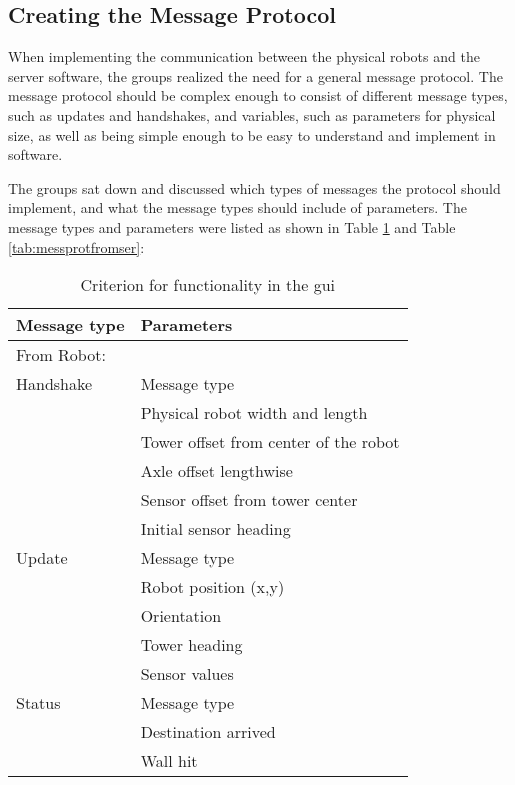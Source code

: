 \subsection{Creating the Message Protocol}
When implementing the communication between the physical robots and the server software, the groups realized the need for a general message protocol. The message protocol should be complex enough to consist of different message types, such as updates and handshakes, and variables, such as parameters for physical size, as well as being simple enough to be easy to understand and implement in software.

The groups sat down and discussed which types of messages the protocol should implement, and what the message types should include of parameters. The message types and parameters were listed as shown in Table \ref{tab:messprotfromrob} and Table \ref{tab:messprotfromser}:

\begin{table}[ht]
\begin{center}
 \begin{tabular}{|l | l|} 
 \hline
 Message type       &	Parameters \\
 \hline
 \hline
 From Robot: & \\
 \hline
 Handshake          &   Message type \\
 					&	Physical robot width and length  \\
                    &   Tower offset from center of the robot\\
                    &	Axle offset lengthwise \\
                    &	Sensor offset from tower center \\
                    &	Initial sensor heading \\
 \hline
 Update  			&   Message type \\
                    &   Robot position (x,y) \\
                    &   Orientation \\
                    &   Tower heading \\
                    &	Sensor values \\
 \hline
 Status		        &   Message type \\
 					&	Destination arrived \\
                    &   Wall hit \\
 \hline
 \end{tabular}
\end{center}
\caption{Criterion for functionality in the \acrshort{gui}}
\label{tab:messprotfromrob}
\end{table}

